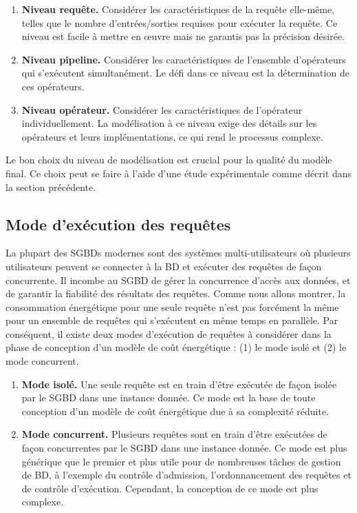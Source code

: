 \begin{enumerate}
 \item \textbf{Niveau requête.} Considérer les caractéristiques de la requête elle-même, telles que le nombre d'entrées/sorties requises pour exécuter la requête. Ce niveau est facile à mettre en œuvre mais ne garantis pas la précision désirée.
 \item \textbf{Niveau pipeline.} Considérer les caractéristiques de l'ensemble d'opérateurs qui s'exécutent simultanément. Le défi dans ce niveau est la détermination de ces opérateurs.
 \item \textbf{Niveau opérateur.} Considérer les caractéristiques de l'opérateur individuellement. La modélisation à ce niveau exige des détails sur les opérateurs et leurs implémentations, ce qui rend le processus complexe.
\end{enumerate}

Le bon choix du niveau de modélisation est crucial pour la qualité du modèle final. Ce choix peut se faire à l'aide d'une étude expérimentale comme décrit dans la section précédente. %

\subsection{Mode d'exécution des requêtes}
La plupart des SGBDs modernes sont des systèmes multi-utilisateurs où plusieurs utilisateurs peuvent se connecter à la BD et exécuter des requêtes de façon concurrente. Il incombe au SGBD de gérer la concurrence d'accès aux données, et de garantir la fiabilité des résultats des requêtes. Comme nous allons montrer, la consommation énergétique pour une seule requête n'est pas forcément la même pour un ensemble de requêtes qui s'exécutent en même temps en parallèle. Par conséquent, il existe deux modes d'exécution de requêtes à considérer dans la phase de conception d'un modèle de coût énergétique : (1) le mode isolé et (2) le mode concurrent.

\begin{enumerate}
 \item \textbf{Mode isolé.} Une seule requête est en train d'être exécutée de façon isolée par le SGBD dans une instance donnée. Ce mode est la base de toute conception d'un modèle de coût énergétique due à sa complexité réduite.
 \item \textbf{Mode concurrent.} Plusieurs requêtes sont en train d'être exécutées de façon concurrentes par le SGBD dans une instance donnée. Ce mode est plus générique que le premier et plus utile pour de nombreuses tâches de gestion de BD, à l'exemple du contrôle d'admission, l'ordonnancement des requêtes et de contrôle d'exécution. Cependant, la conception de ce mode est plus complexe.
\end{enumerate}

